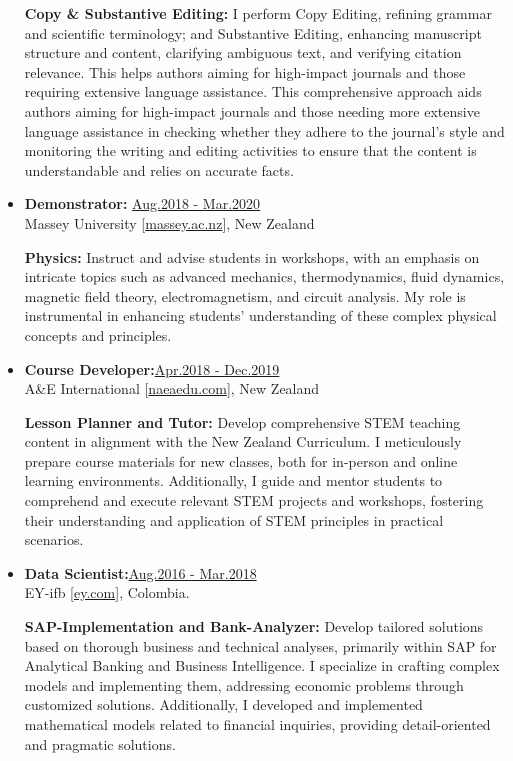\begin{itemize}
          {\noindent
              \textbf{Copy \& Substantive Editing:}
              I perform Copy Editing, refining grammar and scientific terminology; and Substantive Editing, enhancing manuscript structure and content, clarifying ambiguous text, and verifying citation relevance. This helps authors aiming for high-impact journals and those requiring extensive language assistance. This comprehensive approach aids authors aiming for high-impact journals and those needing more extensive language assistance in checking whether they adhere to the journal's style and monitoring the writing and editing activities to ensure that the content is understandable and relies on accurate facts.
          }

    \item {\bf Demonstrator:} \hfill \href{.}{Aug.2018 - Mar.2020}\\
          Massey University [\href{www.massey.ac.nz}{massey.ac.nz}],
          New Zealand

              {\noindent
                  \textbf{Physics:}
                  Instruct and advise students in workshops, with an emphasis on intricate topics such as advanced mechanics, thermodynamics, fluid dynamics, magnetic field theory, electromagnetism, and circuit analysis. My role is instrumental in enhancing students' understanding of these complex physical concepts and principles.
              }

    \item {\bf Course Developer:}\hfill \href{.}{Apr.2018 - Dec.2019}\\
          A\&E International [\href{www.naeaedu.com}{naeaedu.com}],
          New Zealand

              {\noindent
                  \textbf{Lesson Planner and Tutor:}
                  Develop comprehensive STEM teaching content in alignment with the New Zealand Curriculum. I meticulously prepare course materials for new classes, both for in-person and online learning environments. Additionally, I guide and mentor students to comprehend and execute relevant STEM projects and workshops, fostering their understanding and application of STEM principles in practical scenarios.
              }


    \item {\bf Data Scientist:}\hfill \href{.}{Aug.2016 - Mar.2018}\\
          EY-ifb [\href{www.ey.com/en\_gl/ey-ifb}{ey.com}],
          Colombia.

              {\noindent
                  \textbf{SAP-Implementation and Bank-Analyzer:}
                  Develop tailored solutions based on thorough business and technical analyses, primarily within SAP for Analytical Banking and Business Intelligence. I specialize in crafting complex models and implementing them, addressing economic problems through customized solutions. Additionally, I developed and implemented mathematical models related to financial inquiries, providing detail-oriented and pragmatic solutions.
              }


\end{itemize}
